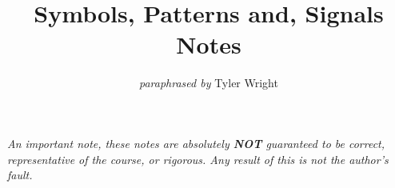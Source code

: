 \documentclass[a4paper, 12pt, twoside]{article}
\begin{document}
\title{Symbols, Patterns and, Signals Notes}
\date{}
\author{\textit{paraphrased by} Tyler Wright}
\maketitle

\vfill

\textit{An important note, these notes are absolutely \textbf{NOT}
  guaranteed to be correct, representative of the course, or rigorous.
  Any result of this is not the author's fault.}

% 

\newpage

\tableofcontents




\end{document}
